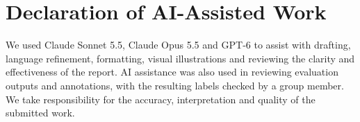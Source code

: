 \documentclass[11pt]{article}
\begin{document}
\section*{Declaration of AI-Assisted Work}

We used Claude Sonnet 5.5, Claude Opus 5.5 and GPT-6 to assist with drafting, language refinement, formatting, visual illustrations and reviewing the clarity and effectiveness of the report. AI assistance was also used in reviewing evaluation outputs and annotations, with the resulting labels checked by a group member. We take responsibility for the accuracy, interpretation and quality of the submitted work.

\clearpage
\printbibliography[heading=bibintoc,title={References}]

\end{document}
